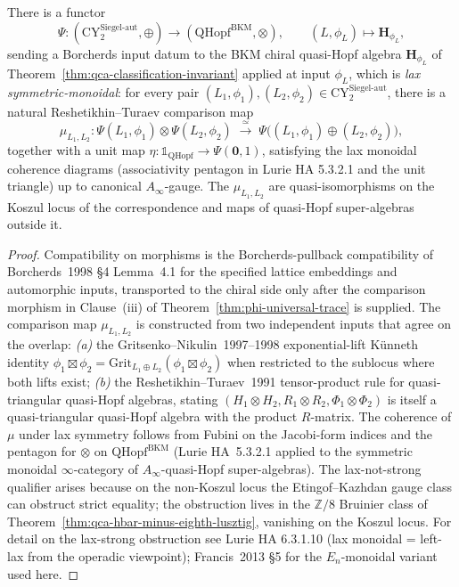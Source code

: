 \begin{theorem}
\label{thm:phiutp-psi-functor-lax-symmon}
There is a functor
\[
 \Psi\colon (\mathrm{CY}^{\mathrm{Siegel\text{-}aut}}_2, \oplus)
 \longrightarrow (\mathrm{QHopf}^{\mathrm{BKM}}, \otimes),
 \qquad
 (L, \phi_L) \longmapsto \mathbf{H}_{\phi_L},
\]
sending a Borcherds input datum to the BKM chiral quasi-Hopf algebra
$\mathbf{H}_{\phi_L}$ of Theorem~\ref{thm:qca-classification-invariant}
applied at input $\phi_L$, which is \emph{lax symmetric-monoidal}: for
every pair $(L_1, \phi_1), (L_2, \phi_2) \in
\mathrm{CY}^{\mathrm{Siegel\text{-}aut}}_2$, there is a natural
Reshetikhin--Turaev comparison map
\[
 \mu_{L_1, L_2}\colon
 \Psi(L_1, \phi_1) \otimes \Psi(L_2, \phi_2)
 \;\xrightarrow{\;\simeq\;}\;
 \Psi\bigl((L_1, \phi_1) \oplus (L_2, \phi_2)\bigr),
\]
together with a unit map $\eta: \mathbb{1}_{\mathrm{QHopf}} \to
\Psi(\mathbf{0}, 1)$, satisfying the lax monoidal coherence diagrams
(associativity pentagon in Lurie HA 5.3.2.1 and the unit triangle) up
to canonical $A_\infty$-gauge. The $\mu_{L_1,L_2}$ are
quasi-isomorphisms on the Koszul locus of the correspondence and maps of
quasi-Hopf super-algebras outside it.
\end{theorem}

\begin{proof}
Compatibility on morphisms is the Borcherds-pullback compatibility of
Borcherds~1998 \S4 Lemma~4.1 for the specified lattice embeddings and
automorphic inputs, transported to the chiral side only after the
comparison morphism in Clause~(iii) of
Theorem~\ref{thm:phi-universal-trace} is supplied. The comparison map
$\mu_{L_1, L_2}$ is constructed from two independent inputs that agree
on the overlap: \emph{(a)} the Gritsenko--Nikulin~1997--1998
exponential-lift K\"unneth identity
$\phi_1 \boxtimes \phi_2 = \mathrm{Grit}_{L_1 \oplus L_2}(\phi_1 \boxtimes \phi_2)$
when restricted to the sublocus where both lifts exist; \emph{(b)} the
Reshetikhin--Turaev~1991 tensor-product rule for quasi-triangular
quasi-Hopf algebras, stating
$(H_1 \otimes H_2, R_1 \otimes R_2, \Phi_1 \otimes \Phi_2)$ is itself a
quasi-triangular quasi-Hopf algebra with the product $R$-matrix. The
coherence of $\mu$ under lax symmetry follows from Fubini on the
Jacobi-form indices and the pentagon for $\otimes$ on
$\mathrm{QHopf}^{\mathrm{BKM}}$ (Lurie HA~5.3.2.1 applied to the
symmetric monoidal $\infty$-category of $A_\infty$-quasi-Hopf
super-algebras). The lax-not-strong qualifier arises because on the
non-Koszul locus the Etingof--Kazhdan gauge class can obstruct strict
equality; the obstruction lives in the $\mathbb{Z}/8$ Bruinier class
of Theorem~\ref{thm:qca-hbar-minus-eighth-lusztig}, vanishing on the
Koszul locus. For detail on the lax-strong obstruction see Lurie HA
6.3.1.10 (lax monoidal = left-lax from the operadic viewpoint);
Francis~2013 \S5 for the $E_n$-monoidal variant used here.
\end{proof}

